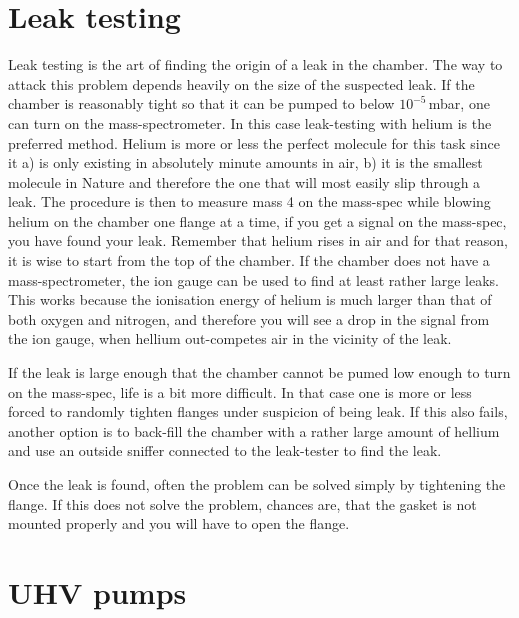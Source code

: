 \documentclass[a4paper,english]{article}
\begin{document}
\section{Leak testing}
Leak testing is the art of finding the origin of a leak in the chamber. The way to attack this problem depends heavily on the size of the suspected leak. If the chamber is reasonably tight so that it can be pumped to below $10^{-5}$\,mbar, one can turn on the mass-spectrometer. In this case leak-testing with helium is the preferred method. Helium is more or less the perfect molecule for this task since it a) is only existing in absolutely minute amounts in air, b) it is the smallest molecule in Nature and therefore the one that will most easily slip through a leak. The procedure is then to measure mass 4 on the mass-spec while blowing helium on the chamber one flange at a time, if you get a signal on the mass-spec, you have found your leak. Remember that helium rises in air and for that reason, it is wise to start from the top of the chamber. If the chamber does not have a mass-spectrometer, the ion gauge can be used to find at least rather large leaks. This works because the ionisation energy of helium is much larger than that of both oxygen and nitrogen, and  therefore you will see a drop in the signal from the ion gauge, when hellium out-competes air in the vicinity of the leak.

If the leak is large enough that the chamber cannot be pumed low enough to turn on the mass-spec, life is a bit more difficult. In that case one is more or less forced to randomly tighten flanges under suspicion of being leak. If this also fails, another option is to back-fill the chamber with a rather large amount of hellium and use an outside sniffer connected to the leak-tester to find the leak.

Once the leak is found, often the problem can be solved simply by tightening the flange. If this does not solve the problem, chances are, that the gasket is not mounted properly and you will have to open the flange.  

\section{UHV pumps}
\end{document}
